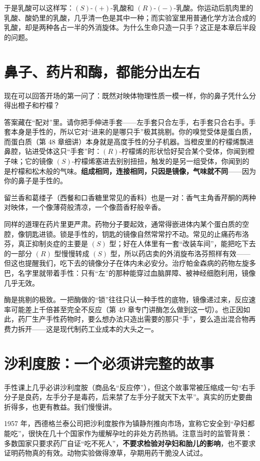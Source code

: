 于是乳酸可以这样写：$(S)$-$(+)$-乳酸和 $(R)$-$(-)$-乳酸。你运动后肌肉里的乳酸、酸奶里的乳酸，几乎清一色是其中一种；而实验室里用普通化学方法合成的乳酸，却是两种各占一半的外消旋体。为什么生命只造一只手？这正是本章后半段的问题。

\section{鼻子、药片和酶，都能分出左右}

现在可以回答开场的第一问了：既然对映体物理性质一模一样，你的鼻子凭什么分得出橙子和柠檬？

答案藏在“配对”里。请你把手伸进手套——左手套只合左手，右手套只合右手。手套本身是手性的，所以它对“进来的是哪只手”极其挑剔。你的嗅觉受体是蛋白质，而蛋白质（第 48 章细讲）本身就是高度手性的分子机器。当橙皮里的柠檬烯飘进鼻腔，钻进受体这只“手套”时：$(R)$-柠檬烯的形状恰好契合某个受体，你闻到橙子味；它的镜像 $(S)$-柠檬烯塞进去别别扭扭，触发的是另一组受体，你闻到的是柠檬和松木般的气味。\textbf{组成相同，连接相同，只因是镜像，气味就不同}——因为你的鼻子是手性的。

留兰香和葛缕子（西餐和口香糖里常见的香料）也是一对：香气主角香芹酮的两种对映体，一个像薄荷般清凉，一个像茴香籽般辛香。

同样的道理在药片里更严肃。药物分子要起效，通常得嵌进体内某个蛋白质的空腔，像钥匙进锁。锁是手性的，钥匙的镜像自然常常拧不动。常见的止痛药布洛芬，真正抑制炎症的主要是 $(S)$ 型；好在人体里有一套“改装车间”，能把吃下去的一部分 $(R)$ 型慢慢转成 $(S)$ 型，所以药店卖的外消旋布洛芬照样有效——但这也提醒我们，吃下去的镜像分子在体内未必安分。治疗帕金森病的药物左旋多巴，名字里就带着手性：只有“左”的那种能穿过血脑屏障、被神经细胞利用，镜像几乎无效。

酶是挑剔的极致。一把酶做的“锁”往往只认一种手性的底物，镜像递过来，反应速率可能差上千倍甚至完全不反应（第 49 章专门讲酶怎么做到这一切）。也正因如此，药厂生产手性药物时，要么想办法只造出需要的那只“手”，要么造出混合物再费力拆开——这是现代制药工业成本的大头之一。

\section{沙利度胺：一个必须讲完整的故事}

手性课上几乎必讲沙利度胺（商品名“反应停”），但这个故事常被压缩成一句“右手分子是良药，左手分子是毒药，后来禁了左手分子就天下太平”。真实的历史要曲折得多，也更有教益。我们慢慢讲。

1957 年，西德格兰泰公司把沙利度胺作为镇静剂推向市场，宣称它安全到“孕妇都能吃”，很快在几十个国家作为缓解孕吐的非处方药热销。注意当时的监管背景：多数国家只要求药厂自证“吃不死人”，\textbf{不要求检验对孕妇和胎儿的影响}，也不要求证明药物真的有效。动物实验做得潦草，孕期用药干脆没人试过。

